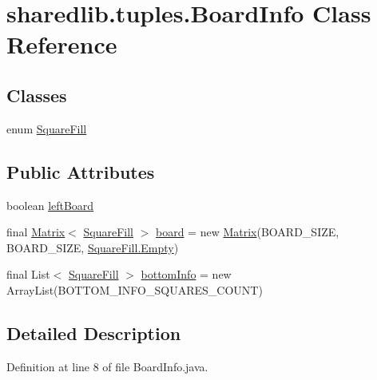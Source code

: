 \hypertarget{classsharedlib_1_1tuples_1_1_board_info}{}\section{sharedlib.\+tuples.\+Board\+Info Class Reference}
\label{classsharedlib_1_1tuples_1_1_board_info}
\subsection*{Classes}
\begin{DoxyCompactItemize}
\item 
enum \hyperlink{enumsharedlib_1_1tuples_1_1_board_info_1_1_square_fill}{Square\+Fill}
\end{DoxyCompactItemize}
\subsection*{Public Attributes}
\begin{DoxyCompactItemize}
\item 
boolean \hyperlink{classsharedlib_1_1tuples_1_1_board_info_ae0dd002903420dfad2aee8f77dc2be10}{left\+Board}
\item 
final \hyperlink{classsharedlib_1_1utils_1_1_matrix}{Matrix}$<$ \hyperlink{enumsharedlib_1_1tuples_1_1_board_info_1_1_square_fill}{Square\+Fill} $>$ \hyperlink{classsharedlib_1_1tuples_1_1_board_info_abd81f6dcb7dd4169511df3a3e61e300b}{board} = new \hyperlink{classsharedlib_1_1utils_1_1_matrix}{Matrix}(B\+O\+A\+R\+D\+\_\+\+S\+I\+ZE, B\+O\+A\+R\+D\+\_\+\+S\+I\+ZE, \hyperlink{enumsharedlib_1_1tuples_1_1_board_info_1_1_square_fill_a3b74fd396b72ace18187bde81bd4d658}{Square\+Fill.\+Empty})
\item 
final List$<$ \hyperlink{enumsharedlib_1_1tuples_1_1_board_info_1_1_square_fill}{Square\+Fill} $>$ \hyperlink{classsharedlib_1_1tuples_1_1_board_info_a21cc80a378b7fb5fd212489ed34d06ab}{bottom\+Info} = new Array\+List(B\+O\+T\+T\+O\+M\+\_\+\+I\+N\+F\+O\+\_\+\+S\+Q\+U\+A\+R\+E\+S\+\_\+\+C\+O\+U\+NT)
\end{DoxyCompactItemize}


\subsection{Detailed Description}


Definition at line 8 of file Board\+Info.\+java.



